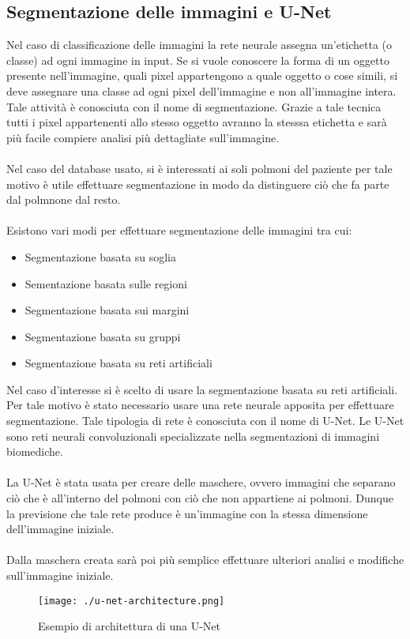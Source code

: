 \subsection{Segmentazione delle immagini e U-Net}
Nel caso di classificazione delle immagini la rete neurale assegna un'etichetta (o classe) ad ogni 
immagine in input. Se si vuole conoscere la forma di un oggetto presente nell'immagine, quali pixel appartengono
a quale oggetto o cose simili, si deve assegnare una classe ad ogni pixel dell'immagine e non all'immagine intera.
Tale attività è conosciuta con il nome di segmentazione. 
Grazie a tale tecnica tutti i pixel appartenenti allo stesso oggetto avranno la stesssa etichetta e
sarà più facile compiere analisi più dettagliate sull'immagine.
\\\\
Nel caso del database usato, si è interessati ai soli polmoni del paziente per tale motivo è utile 
effettuare segmentazione in modo da distinguere ciò che fa parte dal polmnone dal resto.
\\\\
Esistono vari modi per effettuare segmentazione delle immagini tra cui:
\begin{itemize}
    \item Segmentazione basata su soglia
    \item Sementazione basata sulle regioni
    \item Segmentazione basata sui margini
    \item Segmentazione basata su gruppi
    \item Segmentazione basata su reti artificiali
\end{itemize}
Nel caso d'interesse si è scelto di usare la segmentazione basata su reti artificiali.
Per tale motivo è stato necessario usare una rete neurale apposita per effettuare segmentazione.
Tale tipologia di rete è conosciuta con il nome di U-Net. Le U-Net sono reti neurali convoluzionali specializzate
nella segmentazioni di immagini biomediche.
\\\\
La U-Net è stata usata per creare delle maschere, ovvero immagini che separano ciò che è all'interno del polmoni 
con ciò che non appartiene ai polmoni. Dunque la previsione che tale rete produce è un'immagine con la 
stessa dimensione dell'immagine iniziale.
\\\\
Dalla maschera creata sarà poi più semplice effettuare ulteriori analisi e modifiche 
sull'immagine iniziale.
\begin{figure}[h]
    \centering
    \texttt{[image: ./u-net-architecture.png]}
    \label{neural network}
    \caption{Esempio di architettura di una U-Net}
\end{figure}
\clearpage

